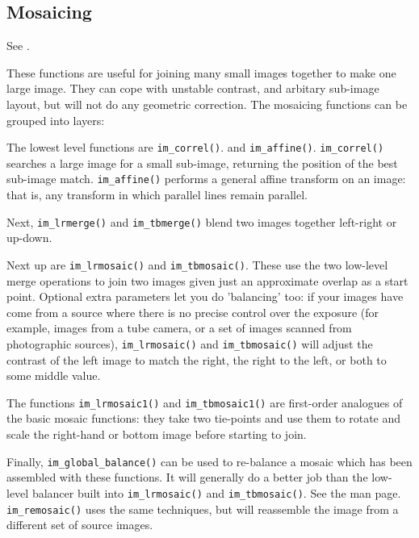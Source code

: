 \subsection{Mosaicing}

See .

These functions are useful for joining many small images together to make one
large image. They can cope with unstable contrast, and arbitary sub-image
layout, but will not do any geometric correction. The mosaicing functions
can be grouped into layers:

The lowest level functions are \verb+im_correl()+. and \verb+im_affine()+.
\verb+im_correl()+  searches a large image for a small sub-image, returning
the position of the best sub-image match.  \verb+im_affine()+ performs
a general affine transform on an image: that is, any transform in which
parallel lines remain parallel.

Next, \verb+im_lrmerge()+ and \verb+im_tbmerge()+ blend two images together
left-right or up-down.

Next up are  \verb+im_lrmosaic()+ and \verb+im_tbmosaic()+. These use the
two low-level merge operations to join two images given just an approximate
overlap as a start point. Optional extra parameters let you do 'balancing'
too: if your images have come from a source where there is no precise
control over the exposure (for example, images from a tube camera, or a
set of images scanned from photographic sources), \verb+im_lrmosaic()+
and \verb+im_tbmosaic()+ will adjust the contrast of the left image to
match the right, the right to the left, or both to some middle value.

The functions \verb+im_lrmosaic1()+ and \verb+im_tbmosaic1()+ are first-order
analogues of the basic mosaic functions: they take two tie-points and use
them to rotate and scale the right-hand or bottom image before starting to join.

Finally, \verb+im_global_balance()+ can be used to re-balance a mosaic
which has been assembled with these functions. It will generally do a
better job than the low-level balancer built into \verb+im_lrmosaic()+
and \verb+im_tbmosaic()+. See the man page. \verb+im_remosaic()+ uses the same
techniques, but will reassemble the image from a different set of source
images.

